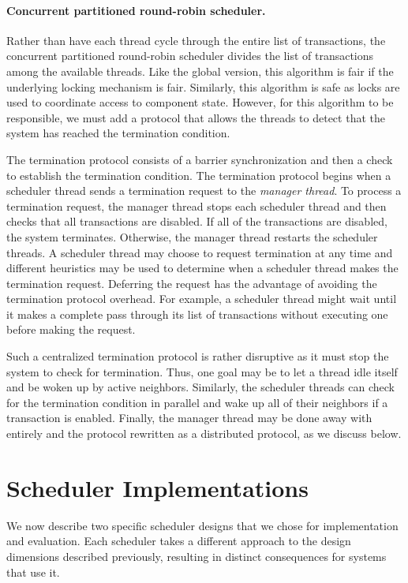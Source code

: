 \paragraph{Concurrent partitioned round-robin scheduler.}
Rather than have each thread cycle through the entire list of transactions, the concurrent partitioned round-robin scheduler divides the list of transactions among the available threads.
Like the global version, this algorithm is fair if the underlying locking mechanism is fair.
Similarly, this algorithm is safe as locks are used to coordinate access to component state.
However, for this algorithm to be responsible, we must add a protocol that allows the threads to detect that the system has reached the termination condition.

The termination protocol consists of a barrier synchronization and then a check to establish the termination condition.
The termination protocol begins when a scheduler thread sends a termination request to the \emph{manager thread}.
To process a termination request, the manager thread stops each scheduler thread and then checks that all transactions are disabled.
If all of the transactions are disabled, the system terminates.
Otherwise, the manager thread restarts the scheduler threads.
A scheduler thread may choose to request termination at any time and different heuristics may be used to determine when a scheduler thread makes the termination request.
Deferring the request has the advantage of avoiding the termination protocol overhead.
For example, a scheduler thread might wait until it makes a complete pass through its list of transactions without executing one before making the request.

Such a centralized termination protocol is rather disruptive as it must stop the system to check for termination.
Thus, one goal may be to let a thread idle itself and be woken up by active neighbors.
Similarly, the scheduler threads can check for the termination condition in parallel and wake up all of their neighbors if a transaction is enabled.
Finally, the manager thread may be done away with entirely and the protocol rewritten as a distributed protocol, as we discuss below.

\section{Scheduler Implementations}

We now describe two specific scheduler designs that we chose for implementation and evaluation.
Each scheduler takes a different approach to the design dimensions described previously, resulting in distinct consequences for systems that use it.


